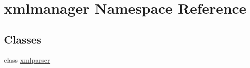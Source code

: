 \hypertarget{namespacexmlmanager}{}\section{xmlmanager Namespace Reference}
\label{namespacexmlmanager}
\subsection*{Classes}
\begin{DoxyCompactItemize}
\item 
class \hyperlink{classxmlmanager_1_1xmlparser}{xmlparser}
\end{DoxyCompactItemize}

